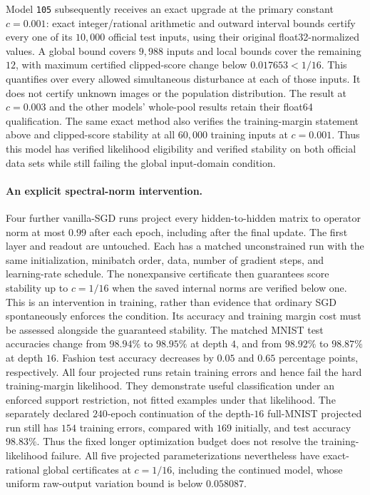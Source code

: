 Model \texttt{105} subsequently receives an exact upgrade at the primary
constant $c=0.001$: exact integer/rational arithmetic and outward
interval bounds certify every one of its $10{,}000$ official test inputs,
using their original float32-normalized values. A global bound covers
$9{,}988$ inputs and local bounds cover the remaining $12$, with maximum
certified clipped-score change below $0.017653<1/16$.
This quantifies over every allowed simultaneous disturbance at each of
those inputs. It does not certify unknown images or the population
distribution. The result at $c=0.003$ and the other models' whole-pool
results retain their float64 qualification.
The same exact method also verifies the training-margin statement above
and clipped-score stability at all $60{,}000$ training inputs at
$c=0.001$. Thus this model has verified likelihood eligibility and
verified stability on both official data sets while still failing the
global input-domain condition.

\paragraph{An explicit spectral-norm intervention.}
Four further vanilla-SGD runs project every hidden-to-hidden matrix
to operator norm at most $0.99$ after each epoch, including after the
final update. The first layer and readout are untouched. Each has a
matched unconstrained run with the same initialization, minibatch order,
data, number of gradient steps, and learning-rate schedule. The
nonexpansive certificate then guarantees score stability up to
$c=1/16$ when the saved internal norms are verified below one.
This is an intervention in training, rather than evidence that ordinary
SGD spontaneously enforces the condition. Its accuracy and training
margin cost must be assessed alongside the guaranteed stability.
The matched MNIST test accuracies change from $98.94\%$ to $98.95\%$
at depth $4$, and from $98.92\%$ to $98.87\%$ at depth $16$.
Fashion test accuracy decreases by $0.05$ and $0.65$ percentage points,
respectively. All four projected runs retain training errors and hence
fail the hard training-margin likelihood. They demonstrate useful
classification under an enforced support restriction, not fitted
examples under that likelihood.
The separately declared $240$-epoch continuation of the depth-$16$
full-MNIST projected run still has $154$ training errors, compared with
$169$ initially, and test accuracy $98.83\%$. Thus the fixed longer
optimization budget does not resolve the training-likelihood failure.
All five projected parameterizations nevertheless have exact-rational
global certificates at $c=1/16$, including the continued model, whose
uniform raw-output variation bound is below $0.058087$.

